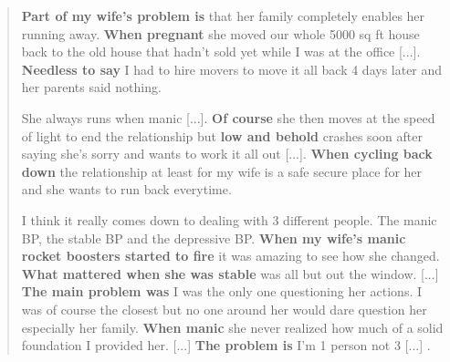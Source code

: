 \begin{quotation} \small \onehalfspacing

\noindent \textbf{Part of my wife's problem is} that her family completely enables her running away. \textbf{When pregnant} she moved our whole 5000 sq ft house back to the old house that hadn't sold yet while I was at the office [...]. \textbf{Needless to say} I had to hire movers to move it all back 4 days later and her parents said nothing.

She always runs when manic [...]. \textbf{Of course} she then moves at the speed of light to end the relationship but \textbf{low and behold} crashes soon after saying she's sorry and wants to work it all out [...]. \textbf{When cycling back down} the relationship at least for my wife is a safe secure place for her and she wants to run back everytime.

I think it really comes down to dealing with 3 different people. The manic BP, the stable BP and the depressive BP. \textbf{When my wife's manic rocket boosters started to fire} it was amazing to see how she changed. \textbf{What mattered when she was stable} was all but out the window. [...]
\textbf{The main problem was} I was the only one questioning her actions. I was of course the closest but no one around her would dare question her especially her family. \textbf{When manic} she never realized how much of a solid foundation I provided her. %
[...] \textbf{The problem is} I'm 1 person not 3 [...] .
\end{quotation}
